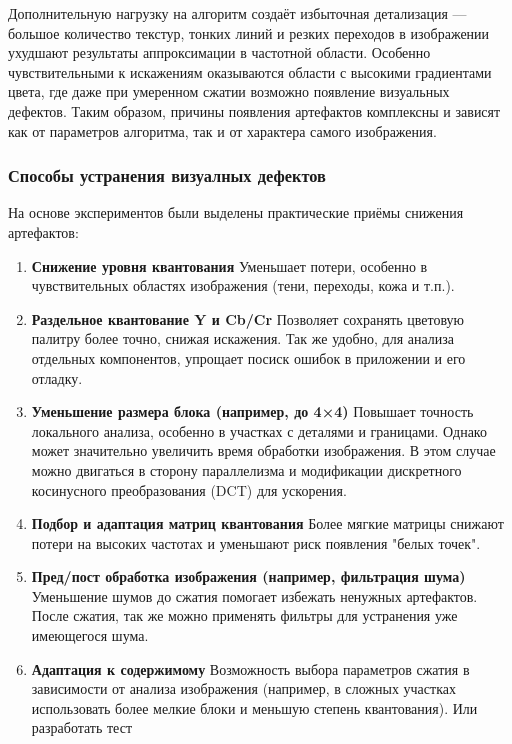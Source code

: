  Дополнительную нагрузку на алгоритм создаёт избыточная детализация — большое количество текстур, 
 тонких линий и резких переходов в изображении ухудшают результаты аппроксимации в частотной области. 
 Особенно чувствительными к искажениям оказываются области с высокими градиентами цвета, 
 где даже при умеренном сжатии возможно появление визуальных дефектов. 
 Таким образом, причины появления артефактов комплексны и зависят как от параметров алгоритма, 
 так и от характера самого изображения.


\subsubsection{Способы устранения визуалных дефектов}

На основе экспериментов были выделены практические приёмы снижения артефактов:

\begin{enumerate}
    \item \textbf{Снижение уровня квантования}
    Уменьшает потери, особенно в чувствительных областях изображения (тени, переходы, кожа и т.п.).

    \item \textbf{Раздельное квантование Y и Cb/Cr}
    Позволяет сохранять цветовую палитру более точно, снижая искажения. Так же удобно, для анализа отдельных
    компонентов, упрощает посиск ошибок в приложении и его отладку.

    \item \textbf{Уменьшение размера блока (например, до 4×4)}
    Повышает точность локального анализа, особенно в участках с деталями и границами.
    Однако может значительно увеличить время обработки изображения. В этом случае можно двигаться в сторону 
    параллелизма и модификации дискретного косинусного преобразования (DCT) для ускорения.

    \item \textbf{Подбор и адаптация матриц квантования}
    Более мягкие матрицы снижают потери на высоких частотах и уменьшают риск появления "белых точек".

    \item \textbf{Пред/пост обработка изображения (например, фильтрация шума)}
    Уменьшение шумов до сжатия помогает избежать ненужных артефактов. После сжатия, так же можно применять
    фильтры для устранения уже имеющегося шума.

    \item \textbf{Адаптация к содержимому}
    Возможность выбора параметров сжатия в зависимости от анализа изображения 
    (например, в сложных участках использовать более мелкие блоки и меньшую степень квантования).
    Или разработать тест 
\end{enumerate}
